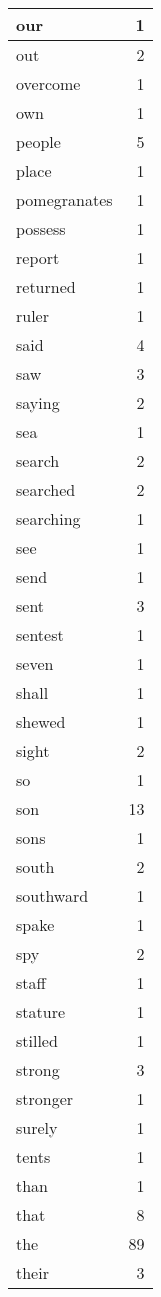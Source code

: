 \begin{center}
\begin{longtable}{l|r}
our & 1\\ \hline 
out & 2\\ \hline 
overcome & 1\\ \hline 
own & 1\\ \hline 
people & 5\\ \hline 
place & 1\\ \hline 
pomegranates & 1\\ \hline 
possess & 1\\ \hline 
report & 1\\ \hline 
returned & 1\\ \hline 
ruler & 1\\ \hline 
said & 4\\ \hline 
saw & 3\\ \hline 
saying & 2\\ \hline 
sea & 1\\ \hline 
search & 2\\ \hline 
searched & 2\\ \hline 
searching & 1\\ \hline 
see & 1\\ \hline 
send & 1\\ \hline 
sent & 3\\ \hline 
sentest & 1\\ \hline 
seven & 1\\ \hline 
shall & 1\\ \hline 
shewed & 1\\ \hline 
sight & 2\\ \hline 
so & 1\\ \hline 
son & 13\\ \hline 
sons & 1\\ \hline 
south & 2\\ \hline 
southward & 1\\ \hline 
spake & 1\\ \hline 
spy & 2\\ \hline 
staff & 1\\ \hline 
stature & 1\\ \hline 
stilled & 1\\ \hline 
strong & 3\\ \hline 
stronger & 1\\ \hline 
surely & 1\\ \hline 
tents & 1\\ \hline 
than & 1\\ \hline 
that & 8\\ \hline 
the & 89\\ \hline 
their & 3\\ \hline 

\end{longtable}
\end{center}
